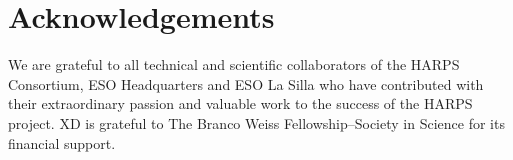 \documentclass{aa}
\begin{document}

\section{Acknowledgements}

We are grateful to all technical and scientific collaborators of the HARPS Consortium, ESO Headquarters and ESO La Silla who have contributed with their extraordinary passion and valuable work to the success of the HARPS project.
XD is grateful to The Branco Weiss Fellowship--Society in Science for its financial support.
\end{document}
